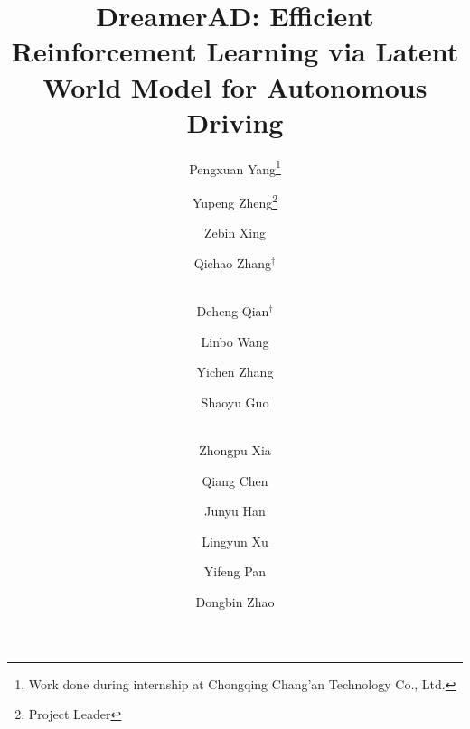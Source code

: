 \documentclass[runningheads]{llncs}
\begin{document}
\title{DreamerAD: Efficient Reinforcement Learning via Latent World Model for Autonomous Driving} 


\author{
    Pengxuan Yang\thanks{Work done during internship at Chongqing Chang’an Technology Co., Ltd.} \and
    Yupeng Zheng\thanks{Project Leader} \and
    Zebin Xing \and
    Qichao Zhang$^{\dagger}$  \and \\
    Deheng Qian$^{\dagger}$ \and
    Linbo Wang \and
    Yichen Zhang\and
    Shaoyu Guo \and \\
    Zhongpu Xia \and 
    Qiang Chen \and 
    Junyu Han \and
    Lingyun Xu \and
    Yifeng Pan\protect\footnotemark[2] \and 
    Dongbin Zhao
}


\end{document}
